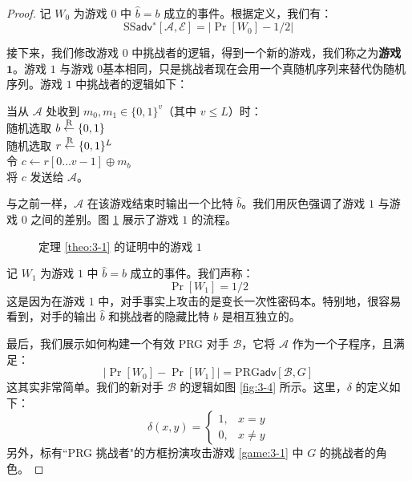 \begin{proof}
记 $W_0$ 为游戏 $0$ 中 $\hat b=b$ 成立的事件。根据定义，我们有：
\begin{equation}\label{eq:3-4}
\mathrm{SS}\mathsf{adv}^∗[\mathcal{A},\mathcal{E}]
=
\big\lvert
\Pr[W_0]-1/2
\big\rvert
\end{equation}

接下来，我们修改游戏 $0$ 中挑战者的逻辑，得到一个新的游戏，我们称之为\textbf{游戏 $\mathbf{1}$}。游戏 $1$ 与游戏 $0$基本相同，只是挑战者现在会用一个真随机序列来替代伪随机序列。游戏 $1$ 中挑战者的逻辑如下：

\vspace*{10pt}

\hspace*{5pt} 当从 $\mathcal A$ 处收到 $m_0,m_1\in\{0,1\}^v$（其中 $v\leq L$）时：\\
\hspace*{50pt} 随机选取 $b\overset{\rm R}\leftarrow\{0,1\}$\\
\hspace*{47pt} \colorbox{gray!50}{随机选取 $r\overset{\rm R}\leftarrow\{0,1\}^L$}\\
\hspace*{50pt} 令 $c\leftarrow r[0\dots v-1]\oplus m_b$\\
\hspace*{50pt} 将 $c$ 发送给 $\mathcal A$。

\vspace*{10pt}

与之前一样，$\mathcal A$ 在该游戏结束时输出一个比特 $\hat b$。我们用灰色强调了游戏 $1$ 与游戏 $0$ 之间的差别。图 \ref{fig:3-3} 展示了游戏 $1$ 的流程。

\begin{figure}
	\centering
	
	\caption{定理 \ref{theo:3-1} 的证明中的游戏 $1$}
	\label{fig:3-3}
\end{figure}

记 $W_1$ 为游戏 $1$ 中 $\hat b=b$ 成立的事件。我们声称：
\begin{equation}\label{eq:3-5}
\Pr[W_1]=1/2
\end{equation}
这是因为在游戏 $1$ 中，对手事实上攻击的是变长一次性密码本。特别地，很容易看到，对手的输出 $\hat b$ 和挑战者的隐藏比特 $b$ 是相互独立的。

\vspace{5pt}

最后，我们展示如何构建一个有效 PRG 对手 $\mathcal B$，它将 $\mathcal A$ 作为一个子程序，且满足：
\begin{equation}\label{eq:3-6}
\big\lvert
\Pr[W_0]-\Pr[W_1]
\big\rvert
=\mathrm{PRG}\mathsf{adv}[\mathcal{B},G]
\end{equation}
这其实非常简单。我们的新对手 $\mathcal B$ 的逻辑如图 \ref{fig:3-4} 所示。这里，$\delta$ 的定义如下：
\begin{equation}\label{eq:3-7}
\delta(x,y)=
\left\{
\begin{array}{ll}
1, & x=y\\
0, & x\neq y
\end{array}
\right.
\end{equation}
另外，标有``PRG 挑战者"的方框扮演攻击游戏 \ref{game:3-1} 中 $G$ 的挑战者的角色。


\end{proof}
